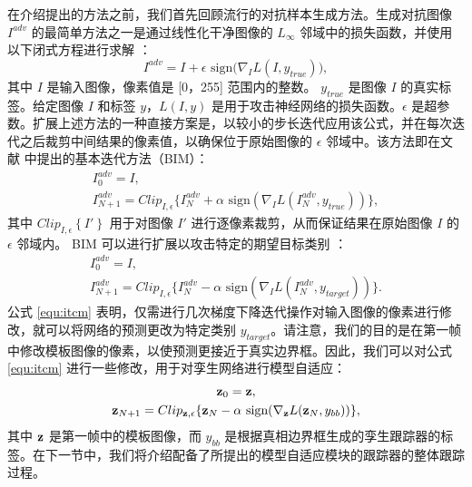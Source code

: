 在介绍提出的方法之前，我们首先回顾流行的对抗样本生成方法。生成对抗图像 $I^{adv}$ 的最简单方法之一是通过线性化干净图像的 $L_{\infty}$ 邻域中的损失函数，并使用以下闭式方程进行求解 \cite{FGSM}：
\begin{equation}
    I^{adv} = I + \epsilon \text{ sign} \bigl( \nabla_I L(I, y_{true})  \bigr),
\end{equation}
其中 $I$ 是输入图像，像素值是 [0，255] 范围内的整数。 $y_{true}$ 是图像 $I$ 的真实标签。给定图像 $I$ 和标签 $y$，$L(I, y)$ 是用于攻击神经网络的损失函数。$\epsilon$ 是超参数。扩展上述方法的一种直接方案是，以较小的步长迭代应用该公式，并在每次迭代之后裁剪中间结果的像素值，以确保位于原始图像的 $\epsilon$ 邻域中。该方法即在文献 \cite{kurakin2017adversarial} 中提出的基本迭代方法（BIM）：
\begin{equation}
    \begin{gathered}
        I_0^{adv} = I, \\
        I_{N+1}^{adv} = Clip_{I,\epsilon}\{I_N^{adv}+\alpha \text{ sign}(\nabla_I L(I_N^{adv},y_{true}))\},
    \end{gathered}
\end{equation}
其中 $Clip_{I, \epsilon} \left\{ I' \right\}$ 用于对图像 $I'$ 进行逐像素裁剪，从而保证结果在原始图像 $I$ 的 $\epsilon$ 邻域内。
BIM 可以进行扩展以攻击特定的期望目标类别 \cite{kurakin2017adversarial}：
\begin{equation}
    \begin{gathered}
        I_0^{adv} = I,\\
        I_{N+1}^{adv} = Clip_{I,\epsilon}\{I_N^{adv}-\alpha \text{ sign}(\nabla_I L(I_N^{adv},y_{target}))\}.
    \end{gathered}
    \label{equ:itcm}
\end{equation}
公式 \ref{equ:itcm} 表明，仅需进行几次梯度下降迭代操作对输入图像的像素进行修改，就可以将网络的预测更改为特定类别 $y_{target}$。请注意，我们的目的是在第一帧中修改模板图像的像素，以使预测更接近于真实边界框。因此，我们可以对公式 \ref{equ:itcm} 进行一些修改，用于对孪生网络进行模型自适应：
\begin{equation}
    \begin{gathered}
        \textbf z_0 = \textbf z,\\
        \textbf z_{N+1} = Clip_{\textbf z,\epsilon}\{\textbf z_N -\alpha \text{ sign}(\nabla_{\textbf z} L(\textbf z_N,y_{bb}))\},
    \end{gathered}
    \label{equ:adaptaion}
\end{equation}
其中 $\textbf z$ 是第一帧中的模板图像，而 $y_{bb}$ 是根据真相边界框生成的孪生跟踪器的标签。在下一节中，我们将介绍配备了所提出的模型自适应模块的跟踪器的整体跟踪过程。

